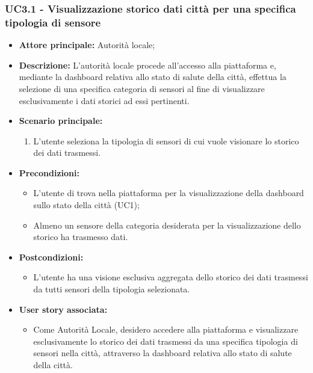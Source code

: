 \subsubsection{UC3.1 - Visualizzazione storico dati città per una specifica tipologia di sensore}
\begin{itemize}
    \item \textbf{Attore principale:} Autorità locale;
    \item \textbf{Descrizione:} L'autorità locale procede all'accesso alla piattaforma e, mediante la dashboard relativa allo stato di salute della città, effettua la selezione di una specifica categoria di sensori al fine di visualizzare esclusivamente i dati storici ad essi pertinenti.
    \item \textbf{Scenario principale:}
        \begin{enumerate}
            \item L'utente seleziona la tipologia di sensori di cui vuole visionare lo storico dei dati trasmessi.
        \end{enumerate}
    \item \textbf{Precondizioni:}
        \begin{itemize}
            \item  L'utente di trova  nella piattaforma per la visualizzazione della dashboard sullo stato della città (UC1);
            \item  Almeno un sensore della categoria desiderata per la visualizzazione dello storico ha trasmesso dati.
        \end{itemize}
    \item \textbf{Postcondizioni:}
        \begin{itemize}
            \item  L'utente ha una visione esclusiva aggregata dello storico dei dati trasmessi da tutti sensori della tipologia selezionata.
        \end{itemize}
    \item \textbf{User story associata:}
        \begin{itemize}
            \item Come Autorità Locale, desidero accedere alla piattaforma e visualizzare esclusivamente lo storico dei dati trasmessi da una specifica tipologia di sensori nella città, attraverso la dashboard relativa allo stato di salute della città.
        \end{itemize}
\end{itemize}